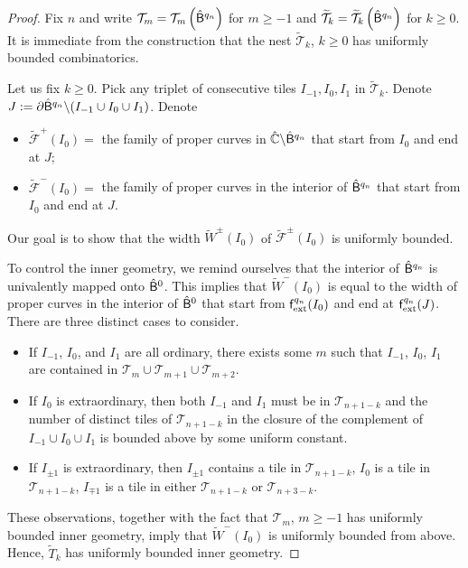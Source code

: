 \documentclass{amsart}
\begin{document}
\begin{proof}
    Fix $n$ and write $\mathcal{T}_m = \mathcal{T}_m \left(\hat{\mathsf{B}}^{q_n} \right)$ for $m \geq -1$ and $\widetilde{\mathcal{T}}_k = \widetilde{\mathcal{T}}_k \left(\hat{\mathsf{B}}^{q_n} \right)$ for $k \geq 0$. 
    It is immediate from the construction that the nest $\widetilde{\mathcal{T}}_k$, $k\geq 0$ has uniformly bounded combinatorics.

    Let us fix $k \geq 0$.
    Pick any triplet of consecutive tiles $I_{-1}, I_0, I_1$ in $\widetilde{\mathcal{T}}_k$. 
    Denote $J := \partial \hat{\mathsf{B}}^{q_n} \backslash (I_{-1} \cup I_0 \cup I_1)$. 
    Denote 
    \begin{itemize}
        \item $\widetilde{\mathcal{F}}^+(I_0) = $ the family of proper curves in $\hat{\mathbb{C}} \backslash \hat{\mathsf{B}}^{q_n}$ that start from $I_0$ and end at $J$;
        \item $\widetilde{\mathcal{F}}^-(I_0) = $ the family of proper curves in the interior of $\hat{\mathsf{B}}^{q_n}$ that start from $I_0$ and end at $J$.
    \end{itemize}
    Our goal is to show that the width $\widetilde{W}^\pm(I_0)$ of $\widetilde{\mathcal{F}}^\pm(I_0)$ is uniformly bounded. 
    
    To control the inner geometry, we remind ourselves that the interior of $\hat{\mathsf{B}}^{q_n}$ is univalently mapped onto $\hat{\mathsf{B}}^{0}$. This implies that $\widetilde{W}^-(I_0)$ is equal to the width of proper curves in the interior of $\hat{\mathsf{B}}^{0}$ that start from $\mathsf{f}_{\textnormal{ext}}^{q_n}(I_0)$ and end at $\mathsf{f}_{\textnormal{ext}}^{q_n}(J)$.
    There are three distinct cases to consider.
    \begin{itemize}
        \item If $I_{-1}$, $I_0$, and $I_1$ are all ordinary, there exists some $m$ such that $I_{-1}$, $I_0$, $I_1$ are contained in $\mathcal{T}_m  \cup \mathcal{T}_{m+1} \cup \mathcal{T}_{m+2}$. 
        \item If $I_0$ is extraordinary, then both $I_{-1}$ and $I_1$ must be in $\mathcal{T}_{n+1-k}$ and the number of distinct tiles of $\mathcal{T}_{n+1-k}$ in the closure of the complement of $I_{-1} \cup I_0 \cup I_1$ is bounded above by some uniform constant.
        \item If $I_{\pm 1}$ is extraordinary, then $I_{\pm 1}$ contains a tile in $\mathcal{T}_{n+1-k}$, $I_0$ is a tile in $\mathcal{T}_{n+1-k}$, $I_{\mp 1}$ is a tile in either $\mathcal{T}_{n+1-k}$ or $\mathcal{T}_{n+3-k}$.
     \end{itemize}
     These observations, together with the fact that $\mathcal{T}_m $, $m \geq -1$ has uniformly bounded inner geometry, imply that $\widetilde{W}^-(I_0)$ is uniformly bounded from above.
     Hence, $\widetilde{T}_k$ has uniformly bounded inner geometry.
     

\end{proof}
\end{document}
